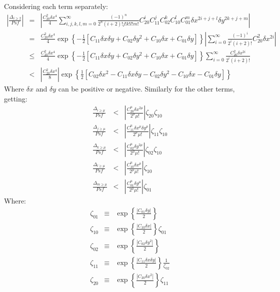 \documentclass{article}
\begin{document}
Considering each term separately:
\begin{eqnarray}
	\left|\frac{\Delta_{i\ge2}}{Psf}\right|&=&\left|\frac{C_{20}^2\delta x^4}{4}
	\sum_{i,j,k,l,m=0}^{\infty} \frac{(-1)^n}{2^n (i+2)!j!k!l!m!}
	C_{20}^i C_{11}^j C_{02}^k C_{10}^l C_{01}^m 
	\delta x^{2i+j+l} \delta y^{2k+j+m}\right|\nonumber\\
%
	&=&\frac{C_{20}^2\delta x^4}{4}\exp\left\{-\frac{1}{2}
	\left[C_{11}\delta x\delta y + C_{02}\delta y^2 + C_{10}\delta x +
	C_{01} \delta y\right] \right\}
	\left|\sum_{i=0}^\infty \frac{(-1)^i}{2^i(i+2)!}C_{20}^2 \delta x^{2i}
	\right|\nonumber\\
%
	&\le&\frac{C_{20}^2\delta x^4}{4}\exp\left\{-\frac{1}{2}
	\left[C_{11}\delta x\delta y + C_{02}\delta y^2 + C_{10}\delta x +
	C_{01} \delta y\right] \right\}
	\sum_{i=0}^\infty \frac{C_{20}^2 \delta x^{2i}}{2^i(i+2)!}
	\nonumber\\
%
	&<&\left|\frac{C_{20}^2\delta x^4}{8}\right|\exp\left\{\frac{1}{2}
	\left[C_{02}\delta x^2 - C_{11}\delta x\delta y - C_{02}\delta y^2 - 
	C_{10}\delta x - C_{01} \delta y\right] \right\}
\end{eqnarray}
Where $\delta x$ and $\delta y$ can be positive or negative.
Similarly for the other terms, getting:
\begin{eqnarray}
	\frac{\Delta_{i\ge\mu}}{Psf}&<&
	\left|\frac{C_{20}^\mu\delta x^{2\mu}}{2^\mu\mu!}\right|
	\zeta_{20}\zeta_{10}
\\
	\frac{\Delta_{j\ge\mu}}{Psf}&<&
	\left|\frac{C_{11}^\mu\delta x^\mu\delta y^\mu}{2^\mu\mu!}\right|
	\zeta_{11}\zeta_{10}
\\
	\frac{\Delta_{k\ge\mu}}{Psf}&<&
	\left|\frac{C_{02}^\mu\delta y^{2\mu}}{2^\mu\mu!}\right|
	\zeta_{02}\zeta_{10}
\\
	\frac{\Delta_{l\ge\mu}}{Psf}&<&
	\left|\frac{C_{10}^\mu\delta x^{\mu}}{2^\mu\mu!}\right|\zeta_{10}
\\
	\frac{\Delta_{m\ge\mu}}{Psf}&<&
	\left|\frac{C_{01}^\mu\delta y^{\mu}}{2^\mu\mu!}\right|\zeta_{01}
\end{eqnarray}
Where:
\begin{eqnarray}
	\zeta_{01}&\equiv&\exp\left\{\frac{|C_{01}\delta y|}{2}\right\}
\\
	\zeta_{10}&\equiv&
	\exp\left\{\frac{|C_{10}\delta x|}{2}\right\}\zeta_{01}
\\
	\zeta_{02}&\equiv&
	\exp\left\{\frac{|C_{02}\delta y^2|}{2}\right\}
\\
	\zeta_{11}&\equiv&
	\exp\left\{\frac{|C_{11}\delta x\delta y|}{2}\right\}\frac{1}{\zeta_{02}}
\\
	\zeta_{20}&\equiv&
	\exp\left\{\frac{|C_{20}\delta x^2|}{2}\right\}\zeta_{11}
\end{eqnarray}
\end{document}
